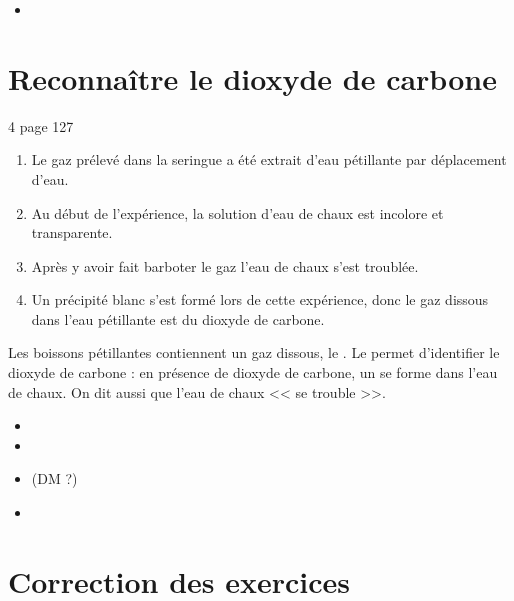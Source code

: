 \documentclass[12pt,a4paper]{article}
\begin{document}
\begin{myexos}
	\begin{multicols}{2}
		
		\begin{itemize}
			\item {}
		\end{itemize}
		
	\end{multicols}
\end{myexos}

\section{Reconnaître le dioxyde de carbone}

\begin{myact}{4 page 127}
	\begin{enumerate}
		\item Le gaz prélevé dans la seringue a été extrait d'eau pétillante par déplacement d'eau.
		\item Au début de l'expérience, la solution d'eau de chaux est incolore et transparente.
		\item Après y avoir fait barboter le gaz l'eau de chaux s'est troublée.
		\item Un précipité blanc s'est formé lors de cette expérience, donc le gaz dissous dans l'eau pétillante est du dioxyde de carbone.
	\end{enumerate}
\end{myact}

\begin{mybilan}
	Les boissons pétillantes contiennent un gaz dissous, le .
	Le  permet d'identifier le dioxyde de carbone : en présence de dioxyde de carbone, un  se forme dans l'eau de chaux. On dit aussi que l'eau de chaux << se trouble >>.
\end{mybilan}

\begin{myexos}
	\begin{multicols}{2}
		
		\begin{itemize}
			\item {}
			\item {}
			\item {} (DM ?)
			\item {}
		\end{itemize}
		
	\end{multicols}
\end{myexos}

\appendix

\newpage

\section{Correction des exercices}
\end{document}
